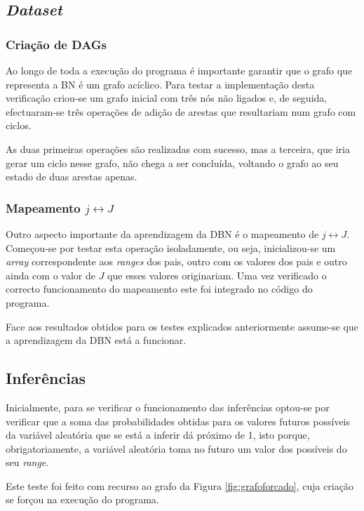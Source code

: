 \documentclass[10pt]{article}
\numberwithin{equation}{section}
\begin{document}
\subsection{\textit{Dataset}}


\subsubsection{Criação de DAGs}

Ao longo de toda a execução do programa é importante garantir que o grafo que representa a BN é um grafo acíclico. Para testar a implementação desta verificação criou-se um grafo inicial com três nós não ligados e, de seguida, efectuaram-se três operações de adição de arestas que resultariam num grafo com ciclos. 

As duas primeiras operações são realizadas com sucesso, mas a terceira, que iria gerar um ciclo nesse grafo, não chega a ser concluída, voltando o grafo ao seu estado de duas arestas apenas. 

\subsubsection{Mapeamento $j \leftrightarrow J$}

Outro aspecto importante da aprendizagem da DBN é o mapeamento de $j \leftrightarrow J$. Começou-se por testar esta operação isoladamente, ou seja, inicializou-se um \textit{array} correspondente aos \textit{ranges} dos pais, outro com os valores dos pais e outro ainda com o valor de $J$ que esses valores originariam. Uma vez verificado o correcto funcionamento do mapeamento este foi integrado no código do programa.

Face aos resultados obtidos para os testes explicados anteriormente assume-se que a aprendizagem da DBN está a funcionar.

\subsection{Inferências}

Inicialmente, para se verificar o funcionamento das inferências optou-se por verificar que a soma das probabilidades obtidas para os valores futuros possíveis da variável aleatória que se está a inferir dá próximo de 1, isto porque, obrigatoriamente, a variável aleatória toma no futuro um valor dos possíveis do seu \textit{range}. 

Este teste foi feito com recurso ao grafo da Figura \ref{fig:grafoforcado}, cuja criação se forçou na execução do programa.
\end{document}
